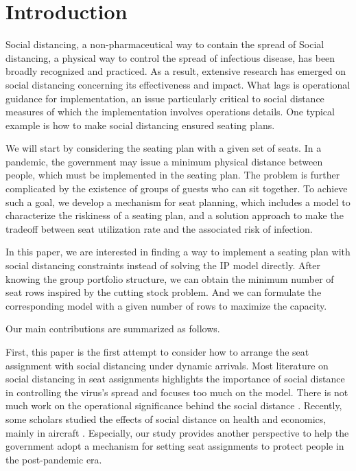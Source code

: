 \section{Introduction}

Social distancing, a non-pharmaceutical way to contain the spread of Social distancing, a physical way to control the spread of infectious disease, has been broadly recognized and practiced. As a result, extensive research has emerged on social distancing concerning its effectiveness and impact. What lags is operational guidance for implementation, an issue particularly critical to social distance measures of which the implementation involves operations details. One typical example is how to make social distancing ensured seating plans.

We will start by considering the seating plan with a given set of seats. In a pandemic, the government may issue a minimum physical distance between people, which must be implemented in the seating plan. The problem is further complicated by the existence of groups of guests who can sit together. To achieve such a goal, we develop a mechanism for seat planning, which includes a model to characterize the riskiness of a seating plan, and a solution approach to make the tradeoff between seat utilization rate and the associated risk of infection.

In this paper, we are interested in finding a way to implement a seating plan with social distancing constraints instead of solving the IP model directly.
After knowing the group portfolio structure, we can obtain the minimum number of seat rows inspired by the cutting stock problem.
And we can formulate the corresponding model with a given number of rows to maximize the capacity.


Our main contributions are summarized as follows.

First, this paper is the first attempt to consider how to arrange the seat assignment with social distancing under dynamic arrivals. 
Most literature on social distancing in seat assignments highlights the importance of social distance in controlling the virus's spread and focuses too much on the model. There is not much work on the operational significance behind the social distance \cite{barry2021optimal} \cite{fischetti2021safe}.
Recently, some scholars studied the effects of social distance on health and economics, mainly in aircraft \cite{salari2020social} \cite{ghorbani2020model}. Especially, our study provides another perspective to help the government adopt a mechanism for setting seat assignments to protect people 
in the post-pandemic era.

